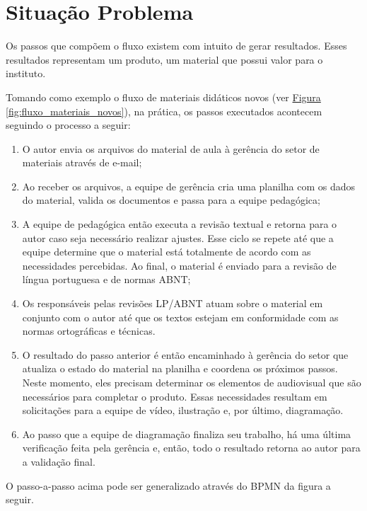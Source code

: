 \section{Situação Problema}

Os passos que compõem o fluxo existem com intuito de gerar resultados. Esses resultados representam um produto, um material que possui valor para o instituto. 

Tomando como exemplo o fluxo de materiais didáticos novos (ver \hyperref[fig:fluxo_materiais_novos]{Figura \ref{fig:fluxo_materiais_novos}}), na prática, os passos executados acontecem seguindo o processo a seguir:

\begin{enumerate}
  \item O autor envia os arquivos do material de aula à gerência do setor de materiais através de e-mail;
  \item Ao receber os arquivos, a equipe de gerência cria uma planilha com os dados do material, valida os documentos e passa para a equipe pedagógica;
  \item A equipe de pedagógica então executa a revisão textual e retorna para o autor caso seja necessário realizar ajustes. Esse ciclo se repete até que a equipe determine que o material está totalmente de acordo com as necessidades percebidas. Ao final, o material é enviado para a revisão de língua portuguesa e de normas ABNT;
  \item Os responsáveis pelas revisões LP/ABNT atuam sobre o material em conjunto com o autor até que os textos estejam em conformidade com as normas ortográficas e técnicas.
  \item O resultado do passo anterior é então encaminhado à gerência do setor que atualiza o estado do material na planilha e coordena os próximos passos. Neste momento, eles precisam determinar os elementos de audiovisual que são necessários para completar o produto. Essas necessidades resultam em solicitações para a equipe de vídeo, ilustração e, por último, diagramação. 
  \item Ao passo que a equipe de diagramação finaliza seu trabalho, há uma última verificação feita pela gerência e, então, todo o resultado retorna ao autor para a validação final.
\end{enumerate}

O passo-a-passo acima pode ser generalizado através do BPMN da figura a seguir.

